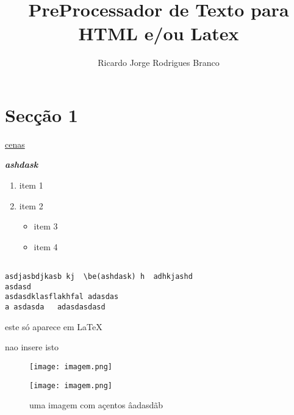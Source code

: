 \documentclass[10pt]{article}
\title{PreProcessador de Texto para HTML e/ou Latex}
\author{Ricardo Jorge Rodrigues Branco}
\begin{document}
\maketitle


\section{Secção 1}

\href{www.gregs.pt:28/item.png}{cenas}

\textbf{\emph{ashdask}}
\begin{enumerate}
\item item 1
\item item 2
\begin{itemize}
\item item 3 
\item item 4
\end{itemize}
\end{enumerate}

\begin{verbatim}

asdjasbdjkasb kj  \be(ashdask) h  adhkjashd    
asdasd
asdasdklasflakhfal adasdas 
a asdasda   adasdasdasd
\end{verbatim}


\begin{comment}
\end{comment}



este só aparece em \LaTeX
 
nao insere isto
\begin{figure}[!hbp]
\texttt{[image: imagem.png]}
\caption{uma imagem com açentos âadasdãb}
\texttt{[image: imagem.png]}
\end{figure}
\end{document}
